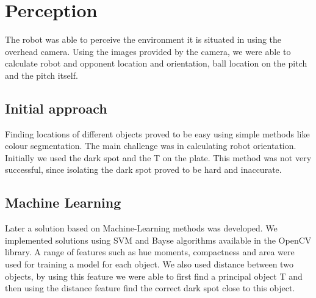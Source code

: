 \section{Perception}
The robot was able to perceive the environment it is situated in using the overhead camera. Using the images provided by the camera, we were able to calculate robot and opponent location and orientation, ball location on the pitch and the pitch itself.

\subsection{Initial approach}
Finding locations of different objects proved to be easy using simple methods like colour segmentation. The main challenge was in calculating robot orientation. Initially we used the dark spot and the T on the plate. This method was not very successful, since isolating the dark spot proved to be hard and inaccurate.
\subsection{Machine Learning}
Later a solution based on Machine-Learning methods was developed. We implemented solutions using SVM and Bayse algorithms available in the OpenCV library. A range of features such as hue moments, compactness and area were used for training a model for each object. We also used distance between two objects, by using this feature we were able to first find a principal object T and then using the distance feature find the correct dark spot close to this object.
